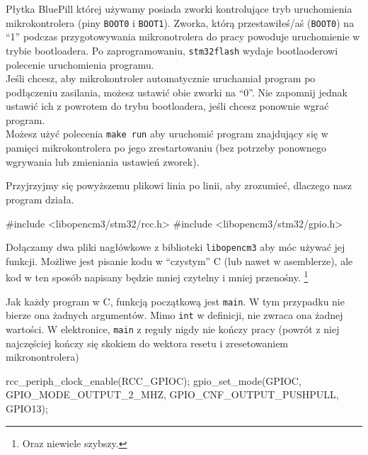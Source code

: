 \documentclass{pdfBooklets}
\begin{document}
\begin{ProTip}{}
  Płytka BluePill której używamy posiada zworki kontrolujące tryb uruchomienia mikrokontrolera (piny \Verb$BOOT0$ i \Verb$BOOT1$).
  Zworka, którą przestawiłeś/aś (\Verb$BOOT0$) na ``1'' podczas przygotowywania mikronotrolera do pracy powoduje uruchomienie w
  trybie bootloadera. Po zaprogramowaniu, \Verb$stm32flash$ wydaje bootlaoderowi polecenie uruchomienia programu.\\
  
  Jeśli chcesz, aby mikrokontroler automatycznie uruchamiał program po podłączeniu zasilania, możesz ustawić obie zworki na ``0''. Nie zapomnij
  jednak ustawić ich z powrotem do trybu bootloadera, jeśli chcesz ponownie wgrać program.\\
  
  Możesz użyć polecenia \Verb$make run$ aby uruchomić program znajdujący się w pamięci mikrokontrolera po jego zrestartowaniu (bez potrzeby ponownego wgrywania lub zmieniania ustawień zworek).
\end{ProTip}

Przyjrzyjmy się powyższemu plikowi linia po linii, aby zrozumieć, dlaczego nasz program działa.

\begin{CodeFrame*}[c]{}
#include <libopencm3/stm32/rcc.h>
#include <libopencm3/stm32/gpio.h>

\end{CodeFrame*}

Dołączamy dwa pliki nagłówkowe z biblioteki \Verb$libopencm3$ aby móc używać jej funkcji. Możliwe jest pisanie kodu w ``czystym'' C
(lub nawet w asemblerze), ale kod w ten sposób napisany będzie mniej czytelny i mniej przenośny.
\footnote{Oraz niewiele szybszy.}

\begin{CodeFrame*}[c]{}
int main() { 
\end{CodeFrame*}

Jak każdy program w C, funkcją początkową jest \verb$main$. W tym przypadku nie bierze ona żadnych argumentów. Mimo \Verb$int$ w
definicji, nie zwraca ona żadnej wartości. W elektronice, \Verb$main$ z reguły nigdy nie kończy pracy (powrót z niej najczęściej
kończy się skokiem do wektora resetu i zresetowaniem mikronontrolera)

\begin{CodeFrame*}[c]{}
  rcc_periph_clock_enable(RCC_GPIOC);
  gpio_set_mode(GPIOC, GPIO_MODE_OUTPUT_2_MHZ, GPIO_CNF_OUTPUT_PUSHPULL, GPIO13);
\end{CodeFrame*}
\end{document}
